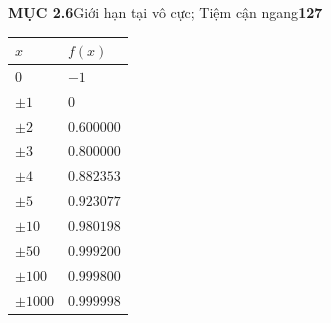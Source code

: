 \noindent
{\fontsize{8.5}{11}\selectfont
\textsf{\textbf{MỤC 2.6}}\hspace{1.5em}\textsf{Giới hạn tại vô cực; Tiệm cận ngang}\hfill\textbf{127}
}
\vspace{3mm}

\noindent
\begin{minipage}[t]{38mm}
  \vspace*{1.5mm}
  \hfill
  
  \vspace{4.2cm}
  \centering
  {\small
  \renewcommand{\arraystretch}{1.15}
  \begin{tabular}{|>{\centering\arraybackslash}p{1.1cm}|>{\centering\arraybackslash}p{1.9cm}|}
  \hline
  $x$ & $f(x)$ \\
  \hline
  $0$ & $-1$ \\
  $\pm 1$ & $0$ \\
  $\pm 2$ & $0.600000$ \\
  $\pm 3$ & $0.800000$ \\
  $\pm 4$ & $0.882353$ \\
  $\pm 5$ & $0.923077$ \\
  $\pm 10$ & $0.980198$ \\
  $\pm 50$ & $0.999200$ \\
  $\pm 100$ & $0.999800$ \\
  $\pm 1000$ & $0.999998$ \\
  \hline
  \end{tabular}
  }
\end{minipage}%
\hfill
